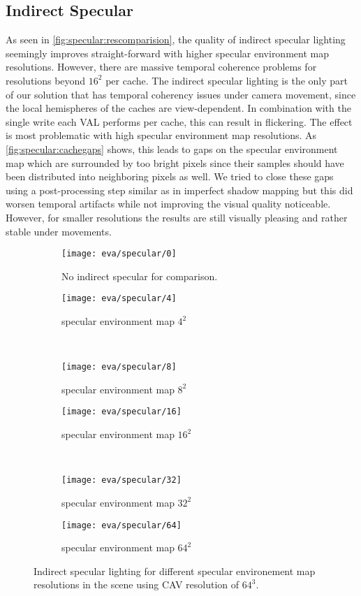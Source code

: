 \documentclass[thesis.tex]{subfiles}
\begin{document}
\subsection{Indirect Specular}\label{sec:eva:specquality}
As seen in \autoref{fig:specular:rescomparision}, the quality of indirect specular lighting seemingly improves straight-forward with higher specular environment map resolutions.
However, there are massive temporal coherence problems for resolutions beyond $16^2$ per cache.
The indirect specular lighting is the only part of our solution that has temporal coherency issues under camera movement, since the local hemispheres of the caches are view-dependent.
In combination with the single write each VAL performs per cache, this can result in flickering.
The effect is most problematic with high specular environment map resolutions.
As \autoref{fig:specular:cachegaps} shows, this leads to gaps on the specular environment map which are surrounded by too bright pixels since their samples should have been distributed into neighboring pixels as well.
We tried to close these gaps using a post-processing step similar as in imperfect shadow mapping \cite{bib:imperfectshadowmaps} but this did worsen temporal artifacts while not improving the visual quality noticeable.
However, for smaller resolutions the results are still visually pleasing and rather stable under movements.
%
\begin{figure}
\begin{subfigure}[b]{\halfpageimage}
\texttt{[image: eva/specular/0]}
\caption{No indirect specular for comparison.}
\end{subfigure}
\begin{subfigure}[b]{\halfpageimage}
\texttt{[image: eva/specular/4]}
\caption{specular environment map $4^2$}
\end{subfigure}
\\
\begin{subfigure}[b]{\halfpageimage}
\texttt{[image: eva/specular/8]}
\caption{specular environment map $8^2$}
\end{subfigure}
\begin{subfigure}[b]{\halfpageimage}
\texttt{[image: eva/specular/16]}
\caption{specular environment map $16^2$}
\end{subfigure}
\\
\begin{subfigure}[b]{\halfpageimage}
\texttt{[image: eva/specular/32]}
\caption{specular environment map $32^2$}
\end{subfigure}
\begin{subfigure}[b]{\halfpageimage}
\texttt{[image: eva/specular/64]}
\caption{specular environment map $64^2$}
\end{subfigure}
\caption{Indirect specular lighting for different specular environement map resolutions in the  scene using CAV resolution of $64^3$. }
\label{fig:specular:rescomparision}
\end{figure}
\end{document}
